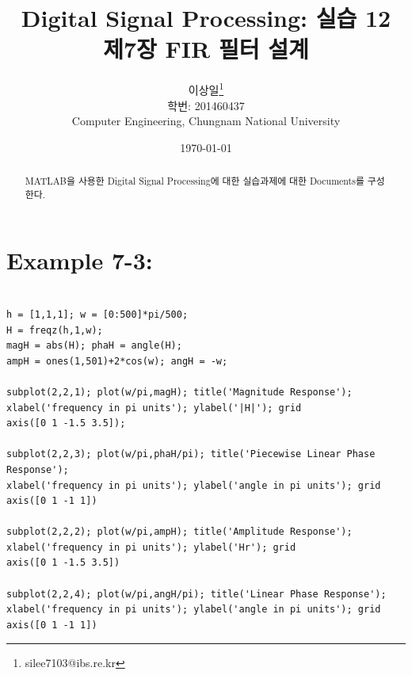 \documentclass[11pt
  , a4paper
  , article
  , oneside
]{memoir}
\begin{document}
\newcommand{\technumber}{
  Digital Signal Processing using MATLAB}
\title{\textbf{Digital Signal Processing: 실습 12 \\
		제7장 FIR 필터 설계 \\}}

\author{이상일\thanks{silee7103@ibs.re.kr} \\

  학번: 201460437\\
  Computer Engineering, Chungnam National University 
}
\date{\today}

\renewcommand{\maketitlehooka}{\begin{flushright}\textsf{\technumber}\end{flushright}}

\maketitle

\begin{abstract}
MATLAB을 사용한 Digital Signal Processing에 대한 실습과제에 대한 Documents를 구성한다.
\end{abstract}

\clearpage
\chapter{Example 7-3:}

\begin{lstlisting}[style=termstyle]
% Example 7.3

h = [1,1,1]; w = [0:500]*pi/500;
H = freqz(h,1,w);
magH = abs(H); phaH = angle(H);
ampH = ones(1,501)+2*cos(w); angH = -w;

subplot(2,2,1); plot(w/pi,magH); title('Magnitude Response');
xlabel('frequency in pi units'); ylabel('|H|'); grid
axis([0 1 -1.5 3.5]);

subplot(2,2,3); plot(w/pi,phaH/pi); title('Piecewise Linear Phase Response');
xlabel('frequency in pi units'); ylabel('angle in pi units'); grid
axis([0 1 -1 1])

subplot(2,2,2); plot(w/pi,ampH); title('Amplitude Response');
xlabel('frequency in pi units'); ylabel('Hr'); grid
axis([0 1 -1.5 3.5])

subplot(2,2,4); plot(w/pi,angH/pi); title('Linear Phase Response');
xlabel('frequency in pi units'); ylabel('angle in pi units'); grid
axis([0 1 -1 1])

\end{lstlisting}
\end{document}
